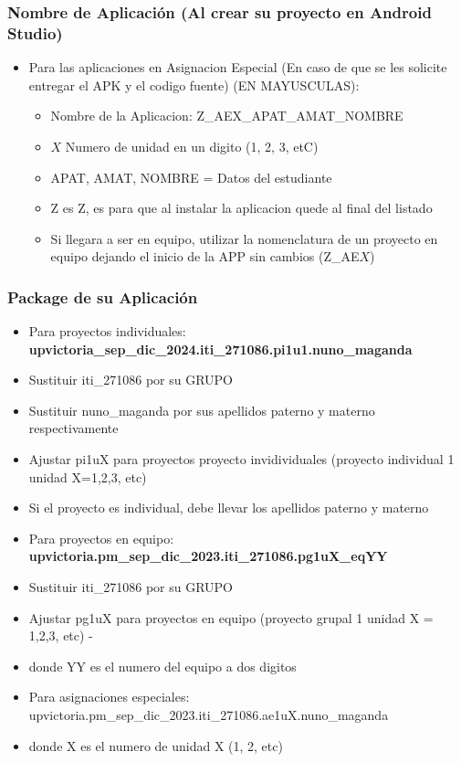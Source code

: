 \begin{frame}
\frametitle{Nombre de Aplicaci\'on (Al crear su proyecto en Android Studio)}
\begin{itemize}
\item Para las aplicaciones en Asignacion Especial (En caso de que se les solicite entregar el APK y el codigo fuente) (EN MAYUSCULAS):
\begin{itemize}
\item Nombre de la Aplicacion: Z\_AEX\_APAT\_AMAT\_NOMBRE
\item $X$ Numero de unidad en un digito (1, 2, 3, etC)
\item APAT, AMAT, NOMBRE = Datos del estudiante
\item Z es Z, es para que al instalar la aplicacion  quede al final del listado
\item Si llegara a ser en equipo, utilizar la nomenclatura de un proyecto en equipo dejando el inicio de la APP sin cambios (Z\_AE$X$)
\end{itemize}
\end{itemize}

\end{frame}

\begin{frame}
\frametitle{Package de su Aplicaci\'on}
\begin{itemize}
\item Para proyectos individuales: \textbf{upvictoria\_sep\_dic\_2024.iti\_271086.pi1u1.nuno\_maganda}
\item Sustituir iti\_271086 por su GRUPO
\item Sustituir nuno\_maganda por sus apellidos paterno y materno respectivamente
\item Ajustar pi1uX para proyectos proyecto invidividuales (proyecto individual 1 unidad X=1,2,3, etc)
\item Si el proyecto es individual, debe llevar los apellidos paterno y materno
\item Para proyectos en equipo: \textbf{upvictoria.pm\_sep\_dic\_2023.iti\_271086.pg1uX\_eqYY}
\item Sustituir iti\_271086 por su GRUPO
\item Ajustar pg1uX para proyectos en equipo (proyecto grupal 1 unidad X = 1,2,3, etc) -
\item donde YY es el numero del equipo a dos digitos
\item Para asignaciones especiales: upvictoria.pm\_sep\_dic\_2023.iti\_271086.ae1uX.nuno\_maganda
\item  donde X es el numero de unidad X (1, 2, etc) 
\end{itemize}

\end{frame}

